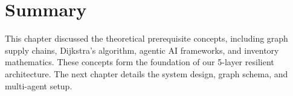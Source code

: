 \section{Summary}
This chapter discussed the theoretical prerequisite concepts, including graph supply chains, Dijkstra's algorithm, agentic AI frameworks, and inventory mathematics. These concepts form the foundation of our 5-layer resilient architecture. The next chapter details the system design, graph schema, and multi-agent setup.
